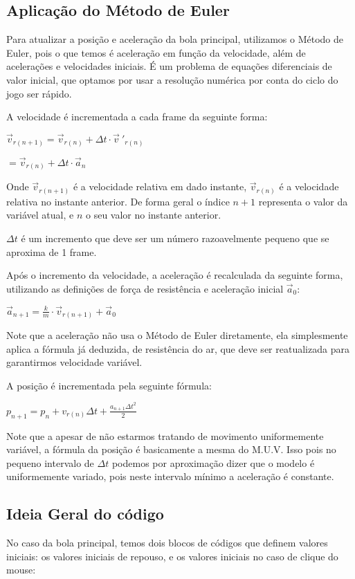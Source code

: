 \documentclass[12pt,letterpaper]{article}
\begin{document}
\subsection*{Aplicação do Método de Euler}

Para atualizar a posição e aceleração da bola principal, utilizamos o Método de Euler, pois o que temos é aceleração em função da velocidade, além de acelerações e velocidades iniciais. É um problema de equações diferenciais de valor inicial, que optamos por usar a resolução numérica por conta do ciclo do jogo ser rápido.

A velocidade é incrementada a cada frame da seguinte forma:

$\vec{v}_{r(n+1)}=\vec{v}_{r(n)}+\Delta t\cdot  \vec{v}~'_{r(n)}$

$=\vec{v}_{r(n)}+\Delta t\cdot  \vec{a}_{n}$

Onde $\vec{v}_{r(n+1)}$ é a velocidade relativa em dado instante, $\vec{v}_{r(n)}$ é a velocidade relativa no instante anterior.
De forma geral o índice $n+1$ representa o valor da variável atual, e $n$ o seu valor no instante anterior.

$\Delta t$ é um incremento que deve ser um número razoavelmente pequeno que se aproxima de 1 frame.

Após o incremento da velocidade, a aceleração é recalculada da seguinte forma, utilizando as definições de força de resistência e aceleração inicial $\vec{a}_0$:

$\vec{a}_{n+1}=\displaystyle\frac k m\cdot\vec{v}_{r(n+1)}+\vec{a}_0$

Note que a aceleração não usa o Método de Euler diretamente, ela simplesmente aplica a fórmula já deduzida, de resistência do ar, que deve ser reatualizada para garantirmos velocidade variável.

A posição é incrementada pela seguinte fórmula:

$p_{n+1}=p_n+v_{r(n)}\Delta t+\displaystyle\frac{a_{n+1}\Delta t^2}{2}$

Note que a apesar de não estarmos tratando de movimento uniformemente variável, a fórmula da posição é basicamente a mesma do M.U.V. Isso pois no pequeno intervalo de $\Delta t$ podemos por aproximação dizer que o modelo é uniformemente variado, pois neste intervalo mínimo a aceleração é constante.

\subsection*{Ideia Geral do código}
No caso da bola principal, temos dois blocos de códigos que definem valores iniciais: os valores iniciais de repouso, e os valores iniciais no caso de clique do mouse:
\end{document}
